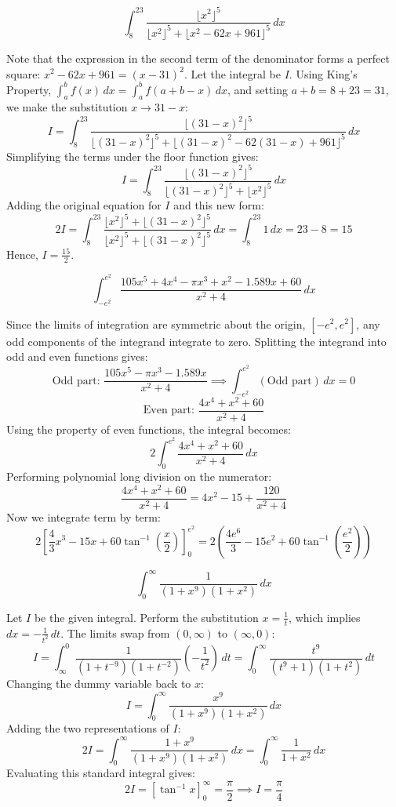 \begin{questions}
\question
\[ \int_{8}^{23} \frac{\lfloor x^2 \rfloor^5}{\lfloor x^2 \rfloor^5 + \lfloor x^2 - 62x + 961 \rfloor^5} \,dx \]
\begin{solution}
Note that the expression in the second term of the denominator forms a perfect square: $x^2 - 62x + 961 = (x - 31)^2$.
Let the integral be $I$. Using King's Property, $\int_{a}^{b} f(x) \,dx = \int_{a}^{b} f(a+b-x) \,dx$, and setting $a+b = 8 + 23 = 31$, we make the substitution $x \to 31 - x$:
\[ I = \int_{8}^{23} \frac{\lfloor (31-x)^2 \rfloor^5}{\lfloor (31-x)^2 \rfloor^5 + \lfloor (31-x)^2 - 62(31-x) + 961 \rfloor^5} \,dx \]
Simplifying the terms under the floor function gives:
\[ I = \int_{8}^{23} \frac{\lfloor (31-x)^2 \rfloor^5}{\lfloor (31-x)^2 \rfloor^5 + \lfloor x^2 \rfloor^5} \,dx \]
Adding the original equation for $I$ and this new form:
\[ 2I = \int_{8}^{23} \frac{\lfloor x^2 \rfloor^5 + \lfloor (31-x)^2 \rfloor^5}{\lfloor x^2 \rfloor^5 + \lfloor (31-x)^2 \rfloor^5} \,dx = \int_{8}^{23} 1 \,dx = 23 - 8 = 15 \]
Hence, $I = \frac{15}{2}$.
\end{solution}

\question
\[ \int_{-e^2}^{e^2} \frac{105x^5 + 4x^4 - \pi x^3 + x^2 - 1.589x + 60}{x^2 + 4} \,dx \]
\begin{solution}
Since the limits of integration are symmetric about the origin, $[-e^2, e^2]$, any odd components of the integrand integrate to zero. Splitting the integrand into odd and even functions gives:
\[ \text{Odd part: } \frac{105x^5 - \pi x^3 - 1.589x}{x^2 + 4} \implies \int_{-e^2}^{e^2} (\text{Odd part}) \,dx = 0 \]
\[ \text{Even part: } \frac{4x^4 + x^2 + 60}{x^2 + 4} \]
Using the property of even functions, the integral becomes:
\[ 2 \int_{0}^{e^2} \frac{4x^4 + x^2 + 60}{x^2 + 4} \,dx \]
Performing polynomial long division on the numerator:
\[ \frac{4x^4 + x^2 + 60}{x^2 + 4} = 4x^2 - 15 + \frac{120}{x^2 + 4} \]
Now we integrate term by term:
\[ 2 \left[ \frac{4}{3}x^3 - 15x + 60 \tan^{-1}\left(\frac{x}{2}\right) \right]_{0}^{e^2} = 2 \left( \frac{4e^6}{3} - 15e^2 + 60 \tan^{-1}\left(\frac{e^2}{2}\right) \right) \]
\end{solution}

\question
\[ \int_{0}^{\infty} \frac{1}{(1 + x^9)(1 + x^2)} \,dx \]
\begin{solution}
Let $I$ be the given integral. Perform the substitution $x = \frac{1}{t}$, which implies $dx = -\frac{1}{t^2} \,dt$. The limits swap from $(0, \infty)$ to $(\infty, 0)$:
\[ I = \int_{\infty}^{0} \frac{1}{(1 + t^{-9})(1 + t^{-2})} \left( -\frac{1}{t^2} \right) \,dt = \int_{0}^{\infty} \frac{t^9}{(t^9 + 1)(1 + t^2)} \,dt \]
Changing the dummy variable back to $x$:
\[ I = \int_{0}^{\infty} \frac{x^9}{(1 + x^9)(1 + x^2)} \,dx \]
Adding the two representations of $I$:
\[ 2I = \int_{0}^{\infty} \frac{1 + x^9}{(1 + x^9)(1 + x^2)} \,dx = \int_{0}^{\infty} \frac{1}{1 + x^2} \,dx \]
Evaluating this standard integral gives:
\[ 2I = \left[ \tan^{-1} x \right]_{0}^{\infty} = \frac{\pi}{2} \implies I = \frac{\pi}{4} \]
\end{solution}


\end{questions}
